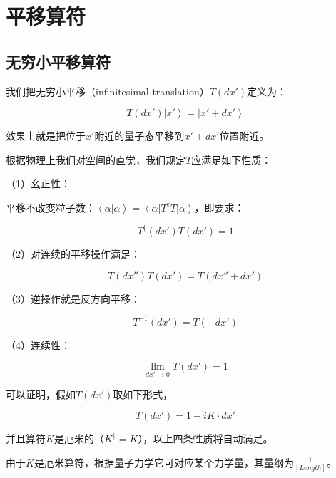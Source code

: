 \section{平移算符}

\subsection{无穷小平移算符}

我们把无穷小平移（infinitesimal translation）$T(dx')$定义为：

\begin{equation}
T(dx') \left| x' \right\rangle = \left| x' + dx' \right\rangle 
\end{equation}

效果上就是把位于$x'$附近的量子态平移到$x'+ dx'$位置附近。

根据物理上我们对空间的直觉，我们规定$T$应满足如下性质：

（1）幺正性：

平移不改变粒子数：$\left\langle \alpha | \alpha \right\rangle = \left\langle \alpha \right| T^\dagger T \left| \alpha \right\rangle  $，即要求：

\begin{equation}
T^\dagger (dx') T (dx') = 1
\end{equation}

（2）对连续的平移操作满足：

\begin{equation}
T( dx'' ) T (dx') = T(dx'' + dx')
\end{equation}

（3）逆操作就是反方向平移：

\begin{equation}
T^{-1} (dx') = T(- d x')
\end{equation}

（4）连续性：

\begin{equation}
\lim\limits_{dx' \to 0} T(dx') = 1
\end{equation}

可以证明，假如$T(dx')$取如下形式，

\begin{equation}
T(dx' ) = 1 - i K \cdot dx'
\end{equation}

并且算符$K$是厄米的（$K^\dagger = K$），以上四条性质将自动满足。

由于$K$是厄米算符，根据量子力学它可对应某个力学量，其量纲为$\frac{1}{[ Length ]}$。

